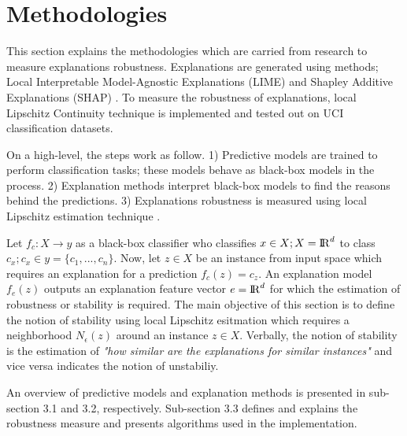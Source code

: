 \documentclass[english]{tktltiki2}
\theoremstyle{definition}
\theoremstyle{remark}
\begin{document}
\section{Methodologies} %
This section explains the methodologies which are carried from research to measure explanations robustness. Explanations are generated using methods; Local Interpretable Model-Agnostic Explanations (LIME) and Shapley Additive Explanations (SHAP) \citep{ribeiro2016should,lundberg2017unified}. To measure the robustness of explanations, local Lipschitz Continuity technique \citep{alvarez2018robustness} is implemented and tested out on UCI classification datasets.

On a high-level, the steps work as follow. 1) Predictive models are trained to perform classification tasks; these models behave as black-box models in the process. 2) Explanation methods interpret black-box models to find the reasons behind the predictions. 3) Explanations robustness is measured using local Lipschitz estimation technique \citep{alvarez2018robustness}.

Let $f_c: X \rightarrow y$ as a black-box classifier who classifies $x \in X; X = {\rm I\!R}^d$ to class $c_x; c_x \in y = \{c_1, ..., c_n\}$. Now, let $z \in X$ be an instance from input space which requires an explanation for a prediction $f_c(z) = c_z$. An explanation model $f_e(z)$ outputs an explanation feature vector $ e = {\rm I\!R}^d$ for which the estimation of robustness or stability is required. The main objective of this section is to define the notion of stability using local Lipschitz esitmation which requires a neighborhood $N_{\epsilon}(z)$ around an instance $z \in X$. Verbally, the notion of stability is the estimation of \textit{"how similar are the explanations for similar instances"} and vice versa indicates the notion of unstabiliy.

An overview of predictive models and explanation methods is presented in sub-section 3.1 and 3.2, respectively. Sub-section 3.3 defines and explains the robustness measure and presents algorithms used in the implementation.
\end{document}
